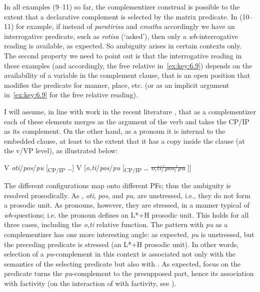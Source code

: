 \documentclass[output=paper]{langsci/langscibook}
\begin{document}
In all examples (9–11) so far, the complementizer construal is possible to the
extent that a declarative complement is selected by the matrix predicate. In
(10–11) for example, if instead of \emph{paratirisa} and \emph{ematha}
accordingly we have an interrogative predicate, such as \emph{rotisa}
(‘asked’), then only a \emph{wh}-interrogative reading is available, as expected. So
ambiguity arises in certain contexts only. The second property we need to point
out is that the interrogative reading in these examples (and accordingly, the
free relative in~\eqref{ex:key:6.9}) depends on the availability of a variable in the
complement clause, that is an open position that modifies the predicate for
manner, place, etc. (or as an implicit argument in~\eqref{ex:key:6.9} for the free relative
reading).

I will assume, in line with work in the recent literature
\parencite{ManSav2007,ManSav2011,Roussou2010,Franco2012}, that as a
complementizer each of these elements merges as the argument of the verb and
takes the CP/IP as its complement. On the other hand, as a pronoun it is
internal to the embedded clause, at least to the extent that it has a copy
inside the clause (at the v/VP level), as illustrated below:

\ea\label{ex:key:6.12}
    \ea V \emph{oti}/\emph{pos}/\emph{pu} [\textsubscript{CP/}\textsubscript{IP} \dots{}]
    \ex V [\emph{o,ti}/\emph{pos}/\emph{pu} [\textsubscript{CP/}\textsubscript{IP} \dots{} \sout{\emph{o,ti}/\emph{pos}/\emph{pu}} ]]
	\z
\z

The different configurations map onto different \glspl{PF}; thus the ambiguity is
resolved prosodically. As , \emph{oti}, \emph{pos}, and
\emph{pu}, are unstressed, i.e., they do not form a prosodic unit. As pronouns,
however, they are stressed, in a manner typical of \emph{wh}-questions; i.e. the
pronoun defines an L*+H prosodic unit. This holds for all three cases,
including the \emph{o,ti} relative function. The pattern with \emph{pu} as a
complementizer has one more interesting angle: as expected, \emph{pu} is
unstressed, but the preceding predicate is stressed (an L*+H prosodic unit). In
other words, selection of a \emph{pu}{}-complement in this context is
associated not only with the semantics of the selecting predicate but also with
. As expected, focus on the predicate turns the \emph{pu}{}-complement to
the presupposed part, hence its association with factivity (on the interaction
of  with factivity, see \citealt{Kallulli2006}).
\end{document}

